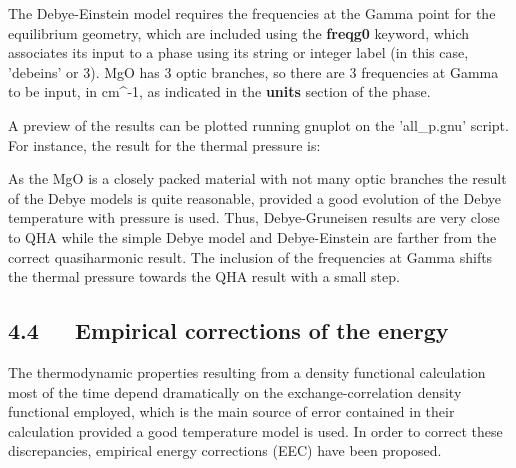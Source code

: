 \documentclass[a4paper]{article}
\begin{document}
The Debye-Einstein model requires the frequencies at the Gamma point
for the equilibrium geometry, which are included using the \textbf{freqg0}
keyword, which associates its input to a phase using its string or
integer label (in this case, 'debeins' or 3). MgO has 3 optic
branches, so there are 3 frequencies at Gamma to be input, in cm\textasciicircum{}-1,
as indicated in the \textbf{units} section of the phase.

A preview of the results can be plotted running gnuplot on the
'all\_p.gnu' script. For instance, the result for the thermal pressure
is:

\noindent{}

As the MgO is a closely packed material with not many optic branches
the result of the Debye models is quite reasonable, provided a good
evolution of the Debye temperature with pressure is used. Thus,
Debye-Gruneisen results are very close to QHA while the simple Debye
model and Debye-Einstein are farther from the correct quasiharmonic
result. The inclusion of the frequencies at Gamma shifts the thermal
pressure towards the QHA result with a small step.


\subsection{4.4~~~Empirical corrections of the energy%
  \label{empirical-corrections-of-the-energy}%
}

The thermodynamic properties resulting from a density functional
calculation most of the time depend dramatically on the
exchange-correlation density functional employed, which is the main
source of error contained in their calculation provided a good
temperature model is used. In order to correct these discrepancies,
empirical energy corrections (EEC) have been proposed.
\end{document}
